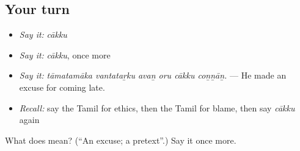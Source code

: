 \subsection*{Your turn}
\begin{itemize}
\raggedright
  \item \emph{Say it:} \emph{cākku}
  \item \emph{Say it:} \emph{cākku}, once more
  \item \emph{Say it:} \emph{tāmatamāka vantataṟku avaṉ oru cākku coṉṉāṉ.} — He made an excuse for coming late.
  \item \emph{Recall:} say the Tamil for ethics, then the Tamil for blame, then say \emph{cākku} again
\end{itemize}

\begin{tcolorbox}[breakable,colback=teal!4,colframe=teal!35!black,title={Before you move on}]
What does  mean? (\textquotedblleft{}An excuse; a pretext\textquotedblright{}.) Say it once more.
\end{tcolorbox}
